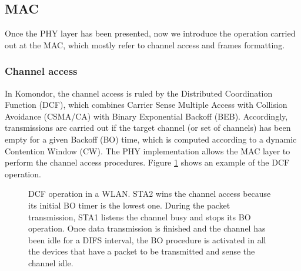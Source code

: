 \documentclass[a4paper]{article}
\begin{document}
%
%
		
\subsection{MAC}
\label{section:mac}
Once the PHY layer has been presented, now we introduce the operation carried out at the MAC, which mostly refer to channel access and frames formatting.

	\subsubsection{Channel access}
	In Komondor, the channel access is ruled by the Distributed Coordination Function (DCF), which combines Carrier Sense Multiple Access with Collision Avoidance (CSMA/CA) with Binary Exponential Backoff (BEB). Accordingly, transmissions are carried out if the target channel (or set of channels) has been empty for a given Backoff (BO) time, which is computed according to a dynamic Contention Window (CW). The PHY implementation allows the MAC layer to perform the channel access procedures. Figure \ref{fig:dcf_operation} shows an example of the DCF operation. 
	\begin{figure}[h!]
		\centering
		\caption{DCF operation in a WLAN. STA2 wins the channel access because its initial BO timer is the lowest one. During the packet transmission, STA1 listens the channel busy and stops its BO operation. Once data transmission is finished and the channel has been idle for a DIFS interval, the BO procedure is activated in all the devices that have a packet to be transmitted and sense the channel idle.}
		\label{fig:dcf_operation}
	\end{figure}
	
\end{document}
